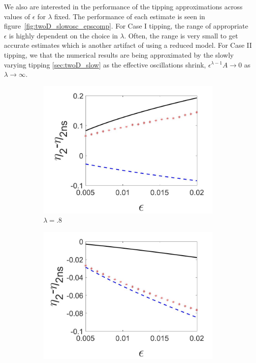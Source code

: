 We also are interested in the performance of the tipping approximations across values of $\epsilon$ for $\lambda$ fixed. The performance of each estimate is seen in figure~\ref{fig:twoD_slowosc_epscomp}. For Case I tipping, the range of appropriate $\epsilon$ is highly dependent on the choice in $\lambda$. Often, the range is very small to get accurate estimates which is another artifact of using a reduced model. For Case II tipping, we that the numerical results are being approximated by the slowly varying tipping \autoref{sec:twoD_slow} as the effective oscillations shrink, $\epsilon^{\lambda-1}A\to 0$ as $\lambda\to\infty$.


\begin{figure}[H]
\centering
\begin{subfigure}{.5\textwidth}
 \centering
 \includegraphics[width=\linewidth]{twoD/slowosc_epscomp_mixed.jpg}
 \caption{$\lambda=.8$}
\end{subfigure}%
\begin{subfigure}{.5\textwidth}
 \centering
 \includegraphics[width=\linewidth]{twoD/slowosc_epscomp_slow.jpg}

\end{subfigure}
\end{figure}
